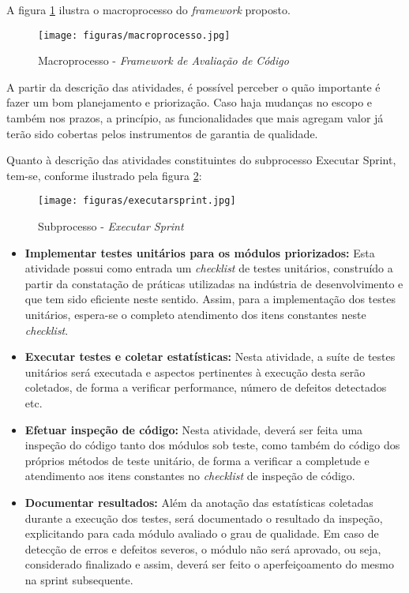A figura \ref{fig:macroprocesso} ilustra o macroprocesso do \textit{framework} proposto.

\begin{figure}[h]
\texttt{[image: figuras/macroprocesso.jpg]}
\caption{Macroprocesso - \textit{Framework de Avaliação de Código}}
\label{fig:macroprocesso}
\end{figure}

A partir da descrição das atividades, é possível perceber o quão importante é fazer um bom planejamento e priorização. Caso haja mudanças no escopo e também nos prazos, a princípio, as funcionalidades que mais agregam valor já terão sido cobertas pelos instrumentos de garantia de qualidade.

Quanto à descrição das atividades constituintes do subprocesso Executar Sprint, tem-se, conforme ilustrado pela figura \ref{fig:subprocesso}:

\begin{figure}[h]
\texttt{[image: figuras/executarsprint.jpg]}
\caption{Subprocesso - \textit{Executar Sprint}}
\label{fig:subprocesso}
\end{figure}

\begin{itemize}
	\item \textbf{Implementar testes unitários para os módulos priorizados:} Esta atividade possui como entrada um \textit{checklist} de testes unitários, construído a partir da constatação de práticas utilizadas na indústria de desenvolvimento e que tem sido eficiente neste sentido. Assim, para a implementação dos testes unitários, espera-se o completo atendimento dos itens constantes neste \textit{checklist}.

	\item \textbf{Executar testes e coletar estatísticas:} Nesta atividade, a suíte de testes unitários será executada e aspectos pertinentes à execução desta serão coletados, de forma a verificar performance, número de defeitos detectados etc.

	\item \textbf{Efetuar inspeção de código:} Nesta atividade, deverá ser feita uma inspeção do código tanto dos módulos sob teste, como também do código dos próprios métodos de teste unitário, de forma a verificar a completude e atendimento aos itens constantes no \textit{checklist} de inspeção de código.

	\item \textbf{Documentar resultados:} Além da anotação das estatísticas coletadas durante a execução dos testes, será documentado o resultado da inspeção, explicitando para cada módulo avaliado o grau de qualidade. Em caso de detecção de erros e defeitos severos, o módulo não será aprovado, ou seja, considerado finalizado e assim, deverá ser feito o aperfeiçoamento do mesmo na sprint subsequente.
\end{itemize}

